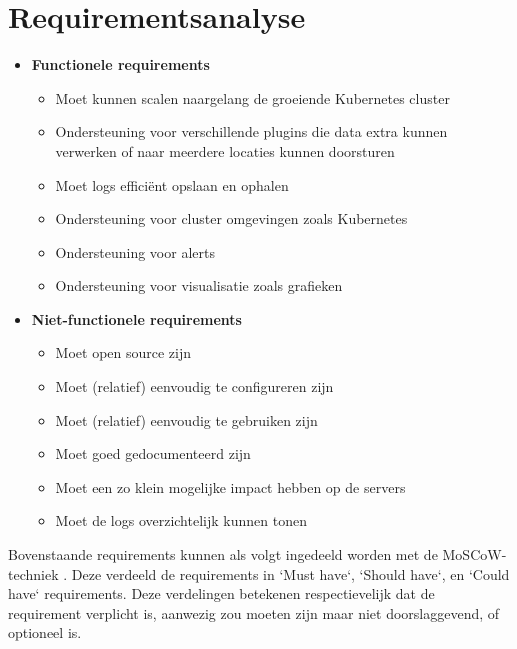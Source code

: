 \section{Requirementsanalyse}
\begin{itemize}
    \item \textbf{Functionele requirements}
        \begin{itemize}
             \item Moet kunnen scalen naargelang de groeiende Kubernetes cluster
            \item Ondersteuning voor verschillende plugins die data extra kunnen verwerken of naar meerdere locaties kunnen doorsturen
            \item Moet logs efficiënt opslaan en ophalen
            \item Ondersteuning voor cluster omgevingen zoals Kubernetes
            \item Ondersteuning voor alerts
            \item Ondersteuning voor visualisatie zoals grafieken
        \end{itemize}
    \item \textbf{Niet-functionele requirements}
        \begin{itemize}
           \item Moet open source zijn
           \item Moet (relatief) eenvoudig te configureren zijn
           \item Moet (relatief) eenvoudig te gebruiken zijn
           \item Moet goed gedocumenteerd zijn
           \item Moet een zo klein mogelijke impact hebben op de servers
           \item Moet de logs overzichtelijk kunnen tonen
        \end{itemize}
\end{itemize}

Bovenstaande requirements kunnen als volgt ingedeeld worden met de MoSCoW-techniek \autocite{consortium}. Deze verdeeld de requirements in `Must have`, `Should have`, en `Could have` requirements. Deze verdelingen betekenen respectievelijk dat de requirement verplicht is, aanwezig zou moeten zijn maar niet doorslaggevend, of optioneel is.  

